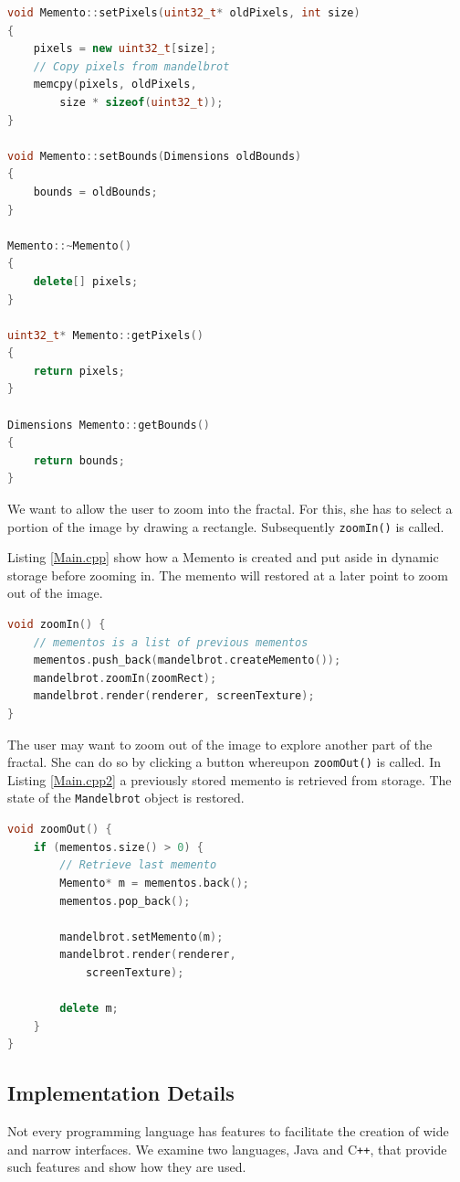 \documentclass[11pt, a4paper, twoside]{article}
\def\cpp{C{}\texttt{++}}
\begin{document}
	\begin{lstlisting}[language=c++, caption={Memento.cpp}, label={Memento.cpp}]
void Memento::setPixels(uint32_t* oldPixels, int size)
{
	pixels = new uint32_t[size];
	// Copy pixels from mandelbrot
	memcpy(pixels, oldPixels,
		size * sizeof(uint32_t));
}

void Memento::setBounds(Dimensions oldBounds)
{
	bounds = oldBounds;
}

Memento::~Memento()
{
	delete[] pixels;
}

uint32_t* Memento::getPixels()
{
	return pixels;
}

Dimensions Memento::getBounds()
{
	return bounds;
}
	\end{lstlisting}
	
	We want to allow the user to zoom into the fractal. For this, she has to select a portion of the image by drawing a rectangle. Subsequently \verb|zoomIn()| is called.
	
	Listing \ref{Main.cpp} show how a Memento is created and put aside in dynamic storage before zooming in. The memento will restored at a later point to zoom out of the image.
	
	\begin{lstlisting}[language=c++, caption={Main.cpp}, label={Main.cpp}]
void zoomIn() {
	// mementos is a list of previous mementos
	mementos.push_back(mandelbrot.createMemento());
	mandelbrot.zoomIn(zoomRect);
	mandelbrot.render(renderer, screenTexture);
}
	\end{lstlisting}
	
	The user may want to zoom out of the image to explore another part of the fractal. She can do so by clicking a button whereupon \verb|zoomOut()| is called. In Listing \ref{Main.cpp2} a previously stored memento is retrieved from storage. The state of the \verb|Mandelbrot| object is restored.
	
	\begin{lstlisting}[language=c++, caption={Main.cpp}, label={Main.cpp2}]
void zoomOut() {
	if (mementos.size() > 0) {
		// Retrieve last memento
		Memento* m = mementos.back();
		mementos.pop_back();
		
		mandelbrot.setMemento(m);
		mandelbrot.render(renderer,
			screenTexture);
		
		delete m;
	}
}
	\end{lstlisting}
	
	\subsection{Implementation Details}
	\label{sec:impl}
	Not every programming language has features to facilitate the creation of wide and narrow interfaces. We examine two languages, Java and \cpp, that provide such features and show how they are used.
	
\end{document}
